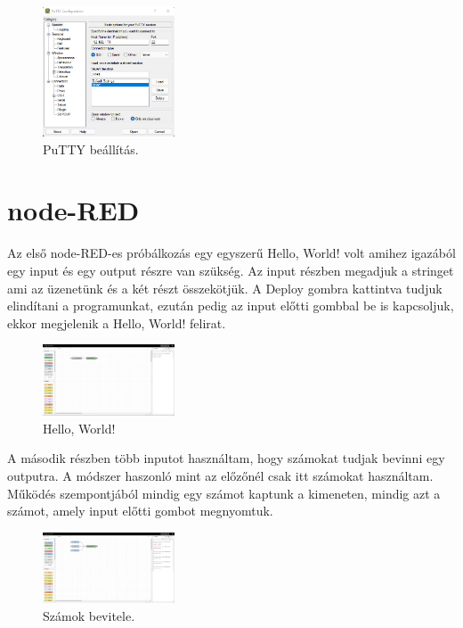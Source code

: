 \documentclass[a4paper,12pt,oneside]{report}
\begin{document}
\begin{figure}[htbp]
	\centering
	\includegraphics[width=0.35\textwidth]{fig/putty.png}
	\caption{PuTTY beállítás.}
	\label{fig-putty}
\end{figure}

\chapter{node-RED}

Az első node-RED-es próbálkozás egy egyszerű Hello, World! volt amihez igazából egy input és egy output részre van szükség.
Az input részben megadjuk a stringet ami az üzenetünk és a két részt összekötjük. A Deploy gombra kattintva tudjuk elindítani a
programunkat, ezután pedig az input előtti gombbal be is kapcsoljuk, ekkor megjelenik a Hello, World! felirat.
\begin{figure}[htbp]
	\centering
	\includegraphics[width=0.35\textwidth]{fig/Hello, World.png}
	\caption{Hello, World!}
	\label{fig-Hello, World}
\end{figure}

A második részben több inputot használtam, hogy számokat tudjak bevinni egy outputra. A módszer haszonló mint az előzőnél
csak itt számokat használtam. Működés szempontjából mindig egy számot kaptunk a kimeneten, mindig azt a számot, amely input előtti
gombot megnyomtuk.
\begin{figure}[htbp]
	\centering
	\includegraphics[width=0.35\textwidth]{fig/Numbers.png}
	\caption{Számok bevitele.}
	\label{fig-Numbers}
\end{figure}
\end{document}
